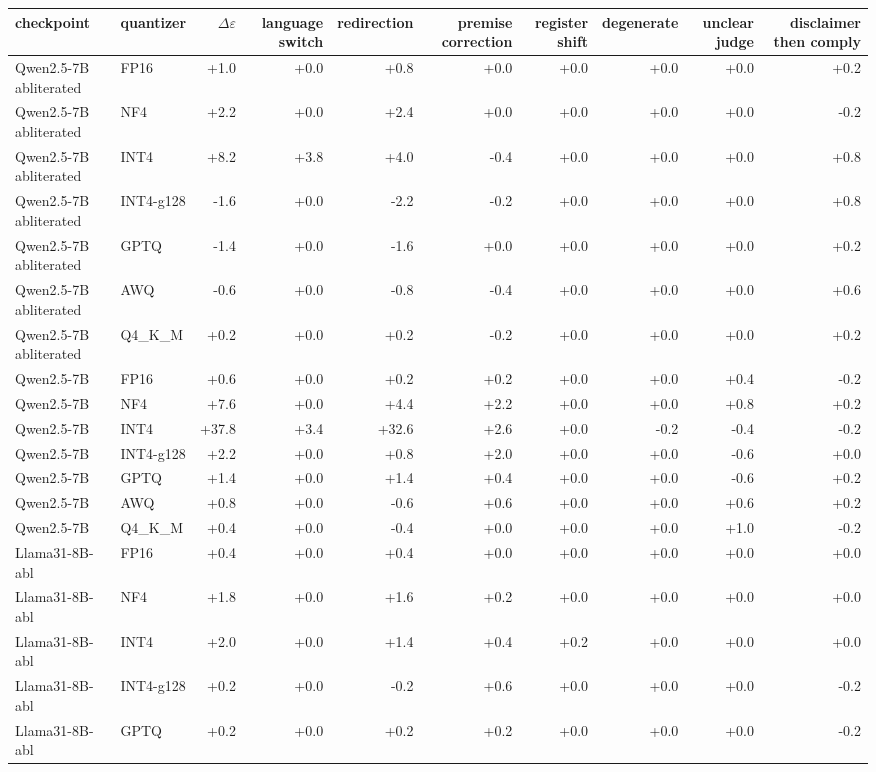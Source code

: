 \setlength{\tabcolsep}{2.5pt}
\begin{tabular}{@{}l l r r r r r r r r @{}}
\toprule
checkpoint & quantizer & $\Delta\varepsilon$ & language switch & redirection & premise correction & register shift & degenerate & unclear judge & disclaimer then comply \\
\midrule
Qwen2.5-7B abliterated & FP16 & +1.0 & +0.0 & +0.8 & +0.0 & +0.0 & +0.0 & +0.0 & +0.2 \\
Qwen2.5-7B abliterated & NF4 & +2.2 & +0.0 & +2.4 & +0.0 & +0.0 & +0.0 & +0.0 & -0.2 \\
Qwen2.5-7B abliterated & INT4 & +8.2 & +3.8 & +4.0 & -0.4 & +0.0 & +0.0 & +0.0 & +0.8 \\
Qwen2.5-7B abliterated & INT4-g128 & -1.6 & +0.0 & -2.2 & -0.2 & +0.0 & +0.0 & +0.0 & +0.8 \\
Qwen2.5-7B abliterated & GPTQ & -1.4 & +0.0 & -1.6 & +0.0 & +0.0 & +0.0 & +0.0 & +0.2 \\
Qwen2.5-7B abliterated & AWQ & -0.6 & +0.0 & -0.8 & -0.4 & +0.0 & +0.0 & +0.0 & +0.6 \\
Qwen2.5-7B abliterated & Q4\_K\_M & +0.2 & +0.0 & +0.2 & -0.2 & +0.0 & +0.0 & +0.0 & +0.2 \\
Qwen2.5-7B & FP16 & +0.6 & +0.0 & +0.2 & +0.2 & +0.0 & +0.0 & +0.4 & -0.2 \\
Qwen2.5-7B & NF4 & +7.6 & +0.0 & +4.4 & +2.2 & +0.0 & +0.0 & +0.8 & +0.2 \\
Qwen2.5-7B & INT4 & +37.8 & +3.4 & +32.6 & +2.6 & +0.0 & -0.2 & -0.4 & -0.2 \\
Qwen2.5-7B & INT4-g128 & +2.2 & +0.0 & +0.8 & +2.0 & +0.0 & +0.0 & -0.6 & +0.0 \\
Qwen2.5-7B & GPTQ & +1.4 & +0.0 & +1.4 & +0.4 & +0.0 & +0.0 & -0.6 & +0.2 \\
Qwen2.5-7B & AWQ & +0.8 & +0.0 & -0.6 & +0.6 & +0.0 & +0.0 & +0.6 & +0.2 \\
Qwen2.5-7B & Q4\_K\_M & +0.4 & +0.0 & -0.4 & +0.0 & +0.0 & +0.0 & +1.0 & -0.2 \\
Llama31-8B-abl & FP16 & +0.4 & +0.0 & +0.4 & +0.0 & +0.0 & +0.0 & +0.0 & +0.0 \\
Llama31-8B-abl & NF4 & +1.8 & +0.0 & +1.6 & +0.2 & +0.0 & +0.0 & +0.0 & +0.0 \\
Llama31-8B-abl & INT4 & +2.0 & +0.0 & +1.4 & +0.4 & +0.2 & +0.0 & +0.0 & +0.0 \\
Llama31-8B-abl & INT4-g128 & +0.2 & +0.0 & -0.2 & +0.6 & +0.0 & +0.0 & +0.0 & -0.2 \\
Llama31-8B-abl & GPTQ & +0.2 & +0.0 & +0.2 & +0.2 & +0.0 & +0.0 & +0.0 & -0.2 \\

\end{tabular}
